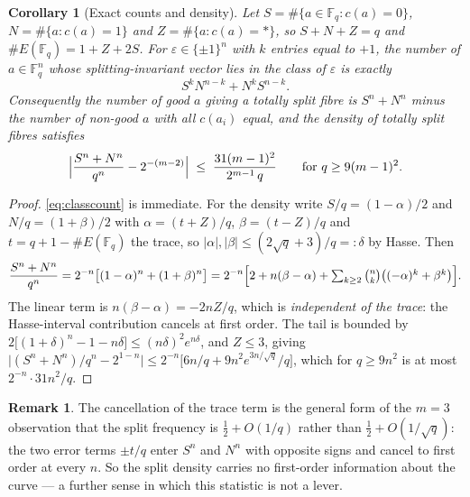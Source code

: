 \documentclass[11pt,a4paper]{article}
\theoremstyle{plain}
\newtheorem{corollary}[theorem]{Corollary}
\theoremstyle{definition}
\newtheorem{remark}[theorem]{Remark}
\newcommand{\FF}{\mathbb{F}}
\newcommand{\Fq}{\FF_q}
\newcommand{\eps}{\varepsilon}
\begin{document}
\begin{corollary}[Exact counts and density]\label{cor:density}
Let $S = \#\{a \in \Fq : c(a) = 0\}$, $N = \#\{a : c(a) = 1\}$ and
$Z = \#\{a : c(a) = \ast\}$, so $S + N + Z = q$ and $\#E(\Fq) = 1 + Z + 2S$.
For $\eps \in \{\pm1\}^n$ with $k$ entries equal to $+1$, the number of
$a \in \Fq^n$ whose splitting-invariant vector lies in the class of $\eps$ is
exactly
\begin{equation}\label{eq:classcount}
  S^k N^{n-k} + N^k S^{n-k}.
\end{equation}
Consequently the number of \emph{good} $a$ giving a totally split fibre is
$S^n + N^n$ minus the number of non-good $a$ with all $c(a_i)$ equal, and the
density of totally split fibres satisfies
\[
  \Bigl| \frac{S^n + N^n}{q^n} - 2^{-(m-2)} \Bigr|
    \;\le\; \frac{31 (m-1)^2}{2^{m-1} \, q}
  \qquad \text{for } q \ge 9(m-1)^2 .
\]
\end{corollary}

\begin{proof}
\eqref{eq:classcount} is immediate. For the density write $S/q = (1-\alpha)/2$ and
$N/q = (1+\beta)/2$ with $\alpha = (t+Z)/q$, $\beta = (t-Z)/q$ and $t = q+1-\#E(\Fq)$
the trace, so $|\alpha|, |\beta| \le (2\sqrt q + 3)/q =: \delta$ by Hasse. Then
\[
  \frac{S^n+N^n}{q^n} = 2^{-n}\bigl[(1-\alpha)^n + (1+\beta)^n\bigr]
   = 2^{-n}\Bigl[ 2 + n(\beta - \alpha) + \textstyle\sum_{k \ge 2}\binom{n}{k}
       \bigl((-\alpha)^k + \beta^k\bigr) \Bigr].
\]
The linear term is $n(\beta - \alpha) = -2nZ/q$, which is \emph{independent of the
trace}: the Hasse-interval contribution cancels at first order. The tail is
bounded by $2\bigl[(1+\delta)^n - 1 - n\delta\bigr] \le (n\delta)^2 e^{n\delta}$,
and $Z \le 3$, giving
$\bigl| (S^n+N^n)/q^n - 2^{1-n} \bigr| \le 2^{-n}\bigl[ 6n/q + 9n^2 e^{3n/\sqrt q}/q \bigr]$,
which for $q \ge 9n^2$ is at most $2^{-n} \cdot 31 n^2 / q$.
\end{proof}

\begin{remark}
The cancellation of the trace term is the general form of the $m = 3$ observation
that the split frequency is $\tfrac12 + O(1/q)$ rather than
$\tfrac12 + O(1/\sqrt q)$: the two error terms $\pm t/q$ enter $S^n$ and $N^n$ with
opposite signs and cancel to first order at every $n$. So the split density
carries no first-order information about the curve --- a further sense in which
this statistic is not a lever.
\end{remark}

\end{document}
